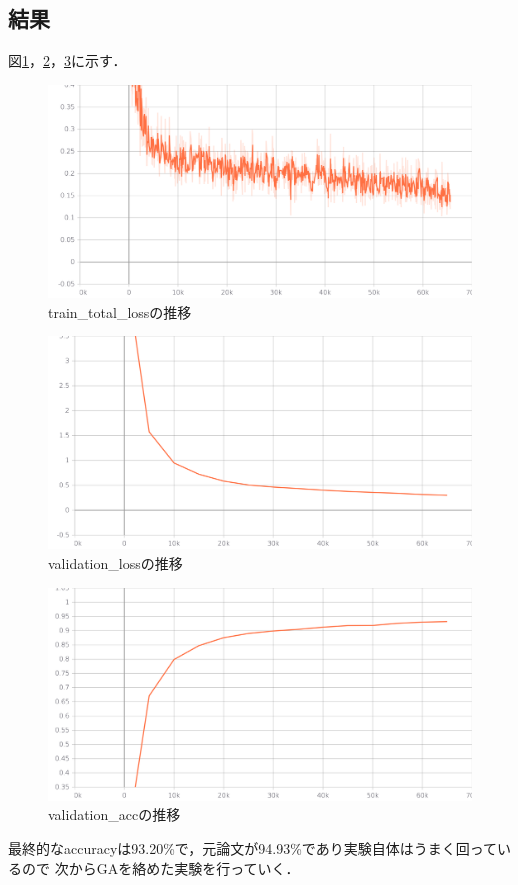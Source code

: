 \documentclass[twocolumn]{jarticle}     %
\begin{document}
\subsection{結果}
図\ref{fig:loss2}，\ref{fig:loss3}，\ref{fig:acc2}に示す．
\begin{figure}[h]
	\centering
	\includegraphics[scale=0.4]{train_total_loss.png}
	\caption{train\_total\_lossの推移\label{fig:loss2}}
\end{figure}
\begin{figure}[h]
	\centering
	\includegraphics[scale=0.4]{eval_loss.png}
	\caption{validation\_lossの推移\label{fig:loss3}}
\end{figure}

\begin{figure}[h]
	\centering
	\includegraphics[scale=0.4]{eval_top-1-acc.png}
	\caption{validation\_accの推移\label{fig:acc2}}
\end{figure}
最終的なaccuracyは93.20\%で，元論文が94.93\%であり実験自体はうまく回っているので
次からGAを絡めた実験を行っていく．
\end{document}
